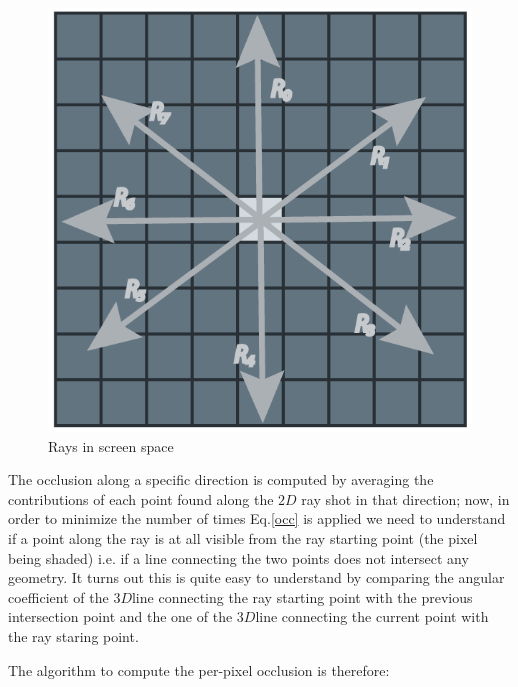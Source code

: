 \documentclass{article}
\begin{document}
\begin{figure}[!ht]
\caption{Rays in screen space}
\begin{center}
\includegraphics{images/SSAO-rays.png}
\end{center}
\label{ssaorays}
\end{figure}
The occlusion along a specific direction is computed by averaging the contributions of each point found along
the $2D$ ray shot in that direction; now, in order to minimize the number of times Eq.\eqref{occ} is applied we need to
understand if a point along the ray is at all visible from the ray starting point (the pixel being shaded) i.e. if a line connecting
the two points does not intersect any geometry. It turns out this is quite easy to understand by comparing 
the angular coefficient of the $3D$\footnotemark[\value{footnote}]
line connecting the ray starting point with the previous intersection point and
the one of the $3D$\footnotemark[\value{footnote}] line connecting the current point with the ray staring point.

The algorithm to compute the per-pixel occlusion is therefore:
\end{document}
